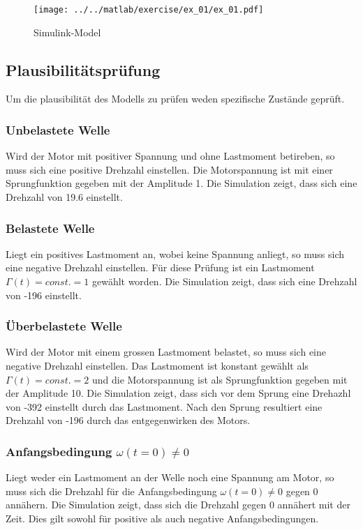 

\begin{figure}[h!]
	\centering
	\texttt{[image: ../../matlab/exercise/ex\_01/ex\_01.pdf]}
	\caption{Simulink-Model}
\end{figure}

\subsection{Plausibilitätsprüfung}
Um die plausibilität des Modells zu prüfen weden spezifische Zustände geprüft.

\subsubsection{Unbelastete Welle}
Wird der Motor mit positiver Spannung und ohne Lastmoment betireben, so muss
sich eine positive Drehzahl einstellen. Die Motorspannung ist mit einer
Sprungfunktion gegeben mit der Amplitude 1. Die Simulation zeigt, dass sich
eine Drehzahl von 19.6 einstellt.

\subsubsection{Belastete Welle}
Liegt ein positives Lastmoment an, wobei keine Spannung anliegt, so muss sich
eine negative Drehzahl einstellen. Für diese Prüfung ist ein Lastmoment
$\Gamma(t) = const. = 1$ gewählt worden. Die Simulation zeigt, dass sich eine
Drehzahl von -196 einstellt.

\subsubsection{Überbelastete Welle}
Wird der Motor mit einem grossen Lastmoment belastet, so muss sich eine
negative Drehzahl einstellen. Das Lastmoment ist konstant gewählt als
$\Gamma(t) = const. = 2$ und die Motorspannung ist als Sprungfunktion
gegeben mit der Amplitude 10. Die Simulation zeigt, dass sich vor dem Sprung
eine Drehazhl von -392 einstellt durch das Lastmoment. Nach den Sprung
resultiert eine Drehzahl von -196 durch das entgegenwirken des Motors.

\subsubsection{Anfangsbedingung $\omega(t=0) \neq 0$}
Liegt weder ein Lastmoment an der Welle noch eine Spannung am Motor, so muss
sich die Drehzahl für die Anfangsbedingung $\omega(t=0) \neq 0$ gegen 0
annähern. Die Simulation zeigt, dass sich die Drehzahl gegen 0 annähert mit
der Zeit. Dies gilt sowohl für positive als auch negative Anfangsbedingungen.

